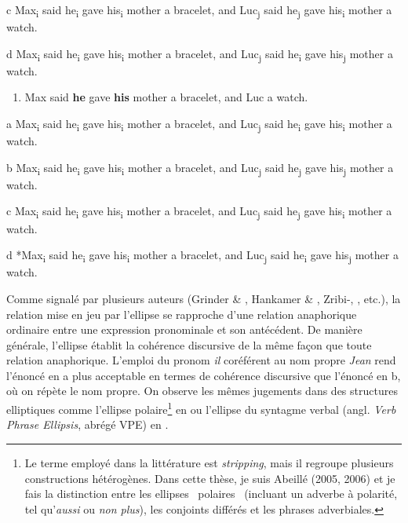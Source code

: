 c  Max\textsubscript{i} said he\textsubscript{i} gave his\textsubscript{i} mother a bracelet, and Luc\textsubscript{j} said he\textsubscript{j} gave his\textsubscript{i} mother a watch.

d  Max\textsubscript{i} said he\textsubscript{i} gave his\textsubscript{i} mother a bracelet, and Luc\textsubscript{j} said he\textsubscript{i} gave his\textsubscript{j} mother a watch.


\begin{enumerate}
\item \label{bkm:Ref286356626}Max said \textbf{he} gave \textbf{his} mother a bracelet, and Luc a watch.  


\end{enumerate}
a  Max\textsubscript{i} said he\textsubscript{i} gave his\textsubscript{i} mother a bracelet, and Luc\textsubscript{j} said he\textsubscript{i} gave his\textsubscript{i} mother a watch. 

b  Max\textsubscript{i} said he\textsubscript{i} gave his\textsubscript{i} mother a bracelet, and Luc\textsubscript{j} said he\textsubscript{j} gave his\textsubscript{j} mother a watch.

c  Max\textsubscript{i} said he\textsubscript{i} gave his\textsubscript{i} mother a bracelet, and Luc\textsubscript{j} said he\textsubscript{j} gave his\textsubscript{i} mother a watch.

d    *Max\textsubscript{i} said he\textsubscript{i} gave his\textsubscript{i} mother a bracelet, and Luc\textsubscript{j} said he\textsubscript{i} gave his\textsubscript{j} mother a watch.

Comme signalé par plusieurs auteurs (Grinder \& \citet{Postal1971}, Hankamer \& \citet{Sag1976}, Zribi-\citet{Hertz1986}, \citet{Gardent1991}, etc.), la relation mise en jeu par l'ellipse se rapproche d'une relation anaphorique ordinaire entre une expression pronominale et son antécédent. De manière générale, l'ellipse établit la cohérence discursive de la même façon que toute relation anaphorique. L'emploi du pronom \textit{il} coréférent au nom propre \textit{Jean} rend l'énoncé en a plus acceptable en termes de cohérence discursive que l'énoncé en b, où on répète le nom propre. On observe les mêmes jugements dans des structures elliptiques comme l'ellipse polaire\footnote{Le terme employé dans la littérature est \textit{stripping}, mais il regroupe plusieurs constructions hétérogènes. Dans cette thèse, je suis Abeillé (2005, 2006) et je fais la distinction entre les ellipses {\guillemotleft}~polaires~{\guillemotright} (incluant un adverbe à polarité, tel qu'\textit{aussi} ou \textit{non plus}), les conjoints différés et les phrases adverbiales.} en  ou l'ellipse du syntagme verbal (angl. \textit{Verb Phrase Ellipsis}, abrégé VPE) en .  


